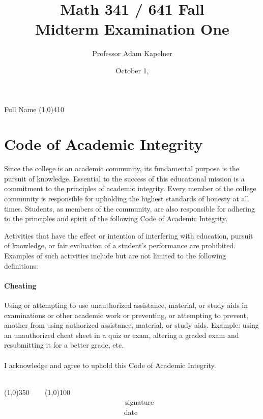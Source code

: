 \documentclass[12pt]{article}
\title{Math 341 / 641 Fall \the\year{} \\ Midterm Examination One}
\author{Professor Adam Kapelner}
\date{October 1, \the\year{}}
\begin{document}
\maketitle

\noindent Full Name \line(1,0){410}

\thispagestyle{empty}

\section*{Code of Academic Integrity}

\footnotesize
Since the college is an academic community, its fundamental purpose is the pursuit of knowledge. Essential to the success of this educational mission is a commitment to the principles of academic integrity. Every member of the college community is responsible for upholding the highest standards of honesty at all times. Students, as members of the community, are also responsible for adhering to the principles and spirit of the following Code of Academic Integrity.

Activities that have the effect or intention of interfering with education, pursuit of knowledge, or fair evaluation of a student's performance are prohibited. Examples of such activities include but are not limited to the following definitions:

\paragraph{Cheating} Using or attempting to use unauthorized assistance, material, or study aids in examinations or other academic work or preventing, or attempting to prevent, another from using authorized assistance, material, or study aids. Example: using an unauthorized cheat sheet in a quiz or exam, altering a graded exam and resubmitting it for a better grade, etc.\\
\\
\noindent I acknowledge and agree to uphold this Code of Academic Integrity. \\~\\

\begin{center}
\line(1,0){350} ~~~ \line(1,0){100}\\
~~~~~~~~~~~~~~~~~~~~~~~~~~~~~~~~~~signature~~~~~~~~~~~~~~~~~~~~~~~~~~~~~~~~~~~~~~~~~~~~~~~~~~~~~~~~~~~~~~ date
\end{center}

\normalsize
\end{document}
